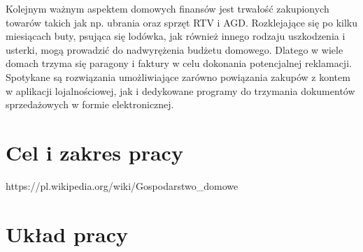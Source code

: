 Kolejnym ważnym aspektem domowych finansów jest trwałość zakupionych towarów takich jak np. ubrania oraz sprzęt RTV i AGD. Rozklejające się po kilku miesiącach buty, psująca się lodówka, jak również innego rodzaju uszkodzenia i usterki, mogą prowadzić do nadwyrężenia budżetu domowego. Dlatego w wiele domach trzyma się paragony i faktury w celu dokonania potencjalnej reklamacji. Spotykane są rozwiązania umożliwiające zarówno powiązania zakupów z kontem w aplikacji lojalnościowej, jak i dedykowane programy do trzymania dokumentów sprzedażowych w formie elektronicznej.



\section{Cel i zakres pracy}
https://pl.wikipedia.org/wiki/Gospodarstwo_domowe
\section{Układ pracy}